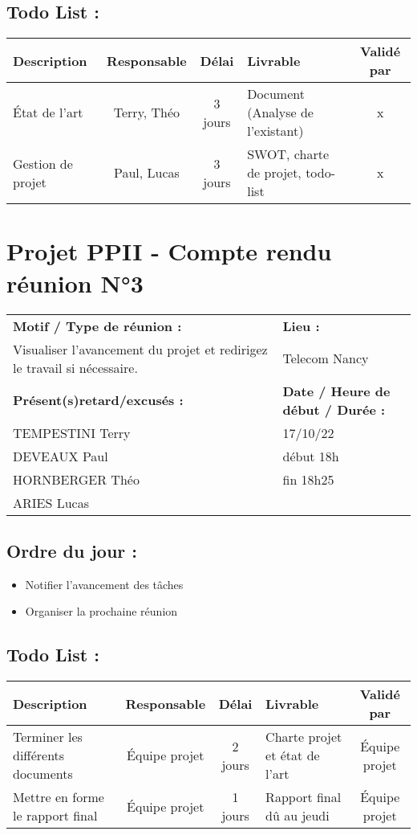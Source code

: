 \documentclass[12pt,titlepage]{report}
\begin{document}
\subsection*{Todo List :}
\begin{tabular}{|p{3.5cm}|c|c|p{4.5cm}|c|}
    \hline 
    Description & Responsable & Délai & Livrable & Validé par 
    \\ \hline
    État de l’art & Terry, Théo & 3 jours &Document (Analyse de l’existant) & x
    \\ \hline
    Gestion de projet & Paul, Lucas & 3 jours & SWOT, charte de projet, todo-list & x
    \\ \hline
\end{tabular}
\newpage

\section*{Projet PPII - Compte rendu réunion N°3}
\begin{tabular}{|p{7cm}|p{6cm}|}
    \hline
    \textbf{Motif / Type de réunion :}
    & \textbf{Lieu :}
    \\
    Visualiser l'avancement du projet et redirigez le travail si nécessaire.
    & 
    Telecom Nancy
    \\ \hline
    \textbf{Présent(s)retard/excusés :}
    &
    \textbf{Date / Heure de début / Durée :}
    \\ 
    TEMPESTINI Terry &  17/10/22\\  
    DEVEAUX Paul & début 18h\\
    HORNBERGER Théo & fin 18h25\\
    ARIES Lucas & 
    \\ \hline
\end{tabular}

\subsection*{Ordre du jour :}
\begin{itemize}
    \item{Notifier l'avancement des tâches}
    \item{Organiser la prochaine réunion}
\end{itemize}

\subsection*{Todo List :}
\begin{tabular}{|p{3.5cm}|c|c|p{4.5cm}|c|}
    \hline 
    Description & Responsable & Délai & Livrable & Validé par 
    \\ \hline
    Terminer les différents documents & Équipe projet & 2 jours & Charte projet et état de l'art & Équipe projet
    \\ \hline
    Mettre en forme le rapport final & Équipe projet & 1 jours & Rapport final dû au jeudi & Équipe projet
    \\ \hline
\end{tabular}
\newpage
\end{document}
